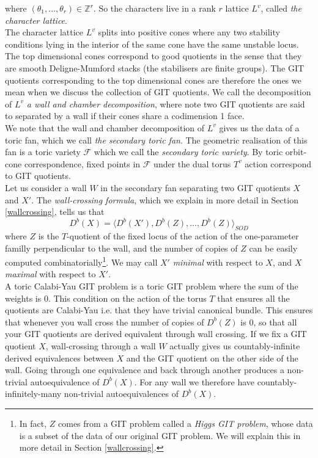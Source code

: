 \documentclass[oneside]{amsart}
\theoremstyle{definition}
\theoremstyle{definition}
\theoremstyle{definition}
\theoremstyle{definition}
\newcommand{\Z}{\mathbb{Z}}
\newcommand{\Fs}{\mathcal{F}}
\begin{document}
where $(\theta_1, \dots, \theta_r) \in \Z^r$. So the characters live in a rank $r$ lattice $L^v$, called \textit{the character lattice}. \\
\newline
The character lattice $L^v$ splits into positive cones where any two stability conditions lying in the interior of the same cone have the same unstable locus. The top dimensional cones correspond to good quotients in the sense that they are smooth Deligne-Mumford stacks (the stabilisers are finite groups). The GIT quotients corresponding to the top dimensional cones are therefore the ones we mean when we discuss the collection of GIT quotients. We call the decomposition of $L^v$ \textit{a wall and chamber decomposition}, where note two GIT quotients are said to separated by a wall if their cones share a codimension 1 face.\\
\newline
We note that the wall and chamber decomposition of $L^v$ gives us the data of a toric fan, which we call \textit{the secondary toric fan}. The geometric realisation of this fan is a toric variety $\Fs$ which we call the \textit{secondary toric variety}. By toric orbit-cone correspondence, fixed points in $\Fs$ under the dual torus $T^v$ action correspond to GIT quotients.  \\
\newline
Let us consider a wall $W$ in the secondary fan separating two GIT quotients $X$ and $X'$. The \textit{wall-crossing formula}, which we explain in more detail in Section \ref{wallcrossing}, tells us that
$$
D^b(X) = \langle D^b(X'), D^b(Z),...,D^b(Z) \rangle_{SOD}
$$
where $Z$ is the $T$-quotient of the fixed locus of the action of the one-parameter familly perpendicular to the wall, and the number of copies of $Z$ can be easily computed combinatorially\footnote{In fact, $Z$ comes from a GIT problem called a \textit{Higgs GIT problem}, whose data is a subset of the data of our original GIT problem. We will explain this in more detail in Section \ref{wallcrossing}.}. We may call $X'$ \textit{minimal} with respect to $X$, and $X$ \textit{maximal} with respect to $X'$. \\
\newline
A toric Calabi-Yau GIT problem is a toric GIT problem where the sum of the weights is 0. This condition on the action of the torus $T$ that ensures all the quotients are Calabi-Yau i.e. that they have trivial canonical bundle. This ensures that whenever you wall cross the number of copies of $D^b(Z)$ is 0, so that all your GIT quotients are derived equivalent through wall crossing. If we fix a GIT quotient $X$, wall-crossing through a wall $W$ actually gives us countably-infinite derived equivalences between $X$ and the GIT quotient on the other side of the wall. Going through one equivalence and back through another produces a non-trivial autoequivalence of $D^b(X)$. For any wall we therefore have countably-infinitely-many non-trivial autoequivalences of $D^b(X)$. \\
\end{document}
